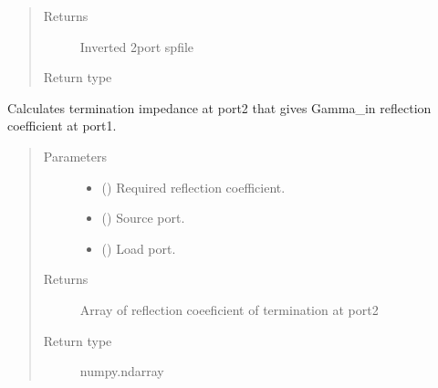 \documentclass[letterpaper,10pt,english]{sphinxmanual}
\begin{document}
\begin{fulllineitems}
\begin{fulllineitems}
\begin{quote}
\begin{description}
\item[{Returns}] \leavevmode
Inverted 2\sphinxhyphen{}port spfile

\item[{Return type}] \leavevmode
{\hyperref[\detokenize{touchstone:touchstone.spfile}]{}}

\end{description}\end{quote}

\end{fulllineitems}


\begin{fulllineitems}
\label{\detokenize{touchstone:touchstone.spfile.load_impedance}}
Calculates termination impedance at port2 that gives Gamma\_in reflection coefficient at port1.
\begin{quote}\begin{description}
\item[{Parameters}] \leavevmode\begin{itemize}
\item {} 
 (\sphinxstyleliteralemphasis{\sphinxupquote{,}}) \textendash{} Required reflection coefficient.

\item {} 
 () \textendash{} Source port.

\item {} 
 () \textendash{} Load port.

\end{itemize}

\item[{Returns}] \leavevmode
Array of reflection coeeficient of termination at port2

\item[{Return type}] \leavevmode
numpy.ndarray


\end{description}
\end{quote}
\end{fulllineitems}
\end{fulllineitems}
\end{document}
